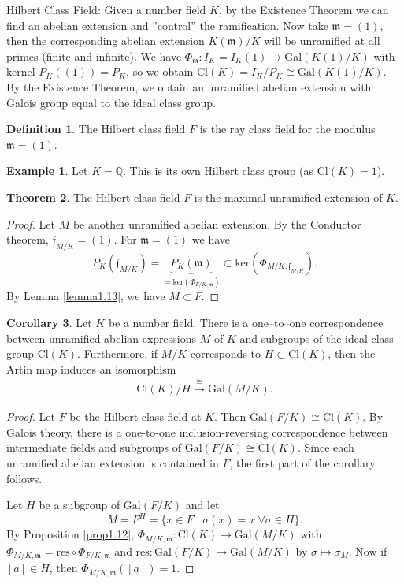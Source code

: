 \documentclass{article}
\theoremstyle{definition}
\newtheorem{theorem}{Theorem}[section]
\newtheorem{cor}[theorem]{Corollary}
\newtheorem{example}{Example}[section]
\newtheorem{defn}[theorem]{Definition}
\begin{document}
Hilbert Class Field: Given a number field $K$, by the Existence Theorem we can find an abelian extension and ''control'' the ramification. Now take $\mathfrak{m} = (1)$, then the corresponding abelian extension $K(\mathfrak{m})/K$ will be unramified at all primes (finite and infinite). We have $\Phi_{\mathfrak{m}}: I_K = I_K(1) \to \text{Gal}(K(1)/K)$ with kernel $P_K((1)) = P_K$, so we obtain $\text{Cl}(K) = I_K/P_K \cong \text{Gal}(K(1)/K)$. By the Existence Theorem, we obtain an unramified abelian extension with Galois group equal to the ideal class group. 
\begin{defn}
    The Hilbert class field $F$ is the ray class field for the modulus $\mathfrak{m}=(1)$.
\end{defn}
\begin{example}
    Let $K=\mathbb{Q}$. This is its own Hilbert class group (as $\text{Cl}(K)=1$).
\end{example}
\begin{theorem}
    The Hilbert class field $F$ is the maximal unramified extension of $K$.
\end{theorem}
\begin{proof}
    Let $M$ be another unramified abelian extension. By the Conductor theorem, $\mathfrak{f}_{M/K} = (1)$. For $\mathfrak{m} = (1)$ we have $$P_K(\mathfrak{f}_{M/K}) = \underbrace{P_K(\mathfrak{m})}_{=\text{ker}(\Phi_{F/K,\mathfrak{m}})} \subset \text{ker}(\Phi_{M/K,\mathfrak{f}_{M/K}}).$$ By Lemma \ref{lemma1.13}, we have $M \subset F$.
\end{proof}
\begin{cor}
    Let $K$ be a number field. There is a one--to--one correspondence between unramified abelian expressions $M$ of $K$ and subgroups of the ideal class group $\text{Cl}(K)$. Furthermore, if $M/K$ corresponds to $H \subset \text{Cl}(K)$, then the Artin map induces an isomorphism 
    \begin{align*}
        \text{Cl}(K)/H \stackrel{\cong}{\to} \text{Gal}(M/K).
    \end{align*}
\end{cor}
\begin{proof}
    Let $F$ be the Hilbert class field at $K$. Then $\text{Gal}(F/K) \cong \text{Cl}(K)$. By Galois theory, there is a one-to-one inclusion-reversing correspondence between intermediate fields and subgroups of $\text{Gal}(F/K) \cong \text{Cl}(K)$. Since each unramified abelian extension is contained in $F$, the first part of the corollary follows.
    \vspace{1mm}
     
    Let $H$ be a subgroup of $\text{Gal}(F/K)$ and let \[
    M = F^H = \{x \in F \mid \sigma(x)=x ~\forall \sigma \in H\}.
    \]
    By Proposition \ref{prop1.12}, $\Phi_{M/K,\mathfrak{m}} : \text{Cl}(K) \to \text{Gal}(M/K)$ with $\Phi_{M/K,\mathfrak{m}} = \text{res} \circ \Phi_{F/K,\mathfrak{m}}$ and $\text{res}:\text{Gal}(F/K) \to \text{Gal}(M/K)$ by $\sigma \mapsto \sigma_M$. Now if $[a] \in H$, then $\Phi_{M/K,\mathfrak{m}}([a])=1$.
\end{proof}
\end{document}
